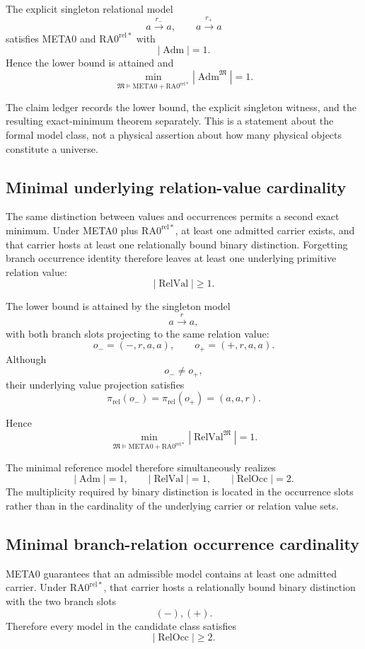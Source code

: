 \documentclass[11pt]{article}
\begin{document}
The explicit singleton relational model
\[
a\xrightarrow{r_-}a,
\qquad
a\xrightarrow{r_+}a
\]
satisfies META0 and \(\mathrm{RA0}^{\mathrm{rel}*}\) with
\[
|\operatorname{Adm}|=1.
\]
Hence the lower bound is attained and
\[
\boxed{
\min_{\mathfrak M\models
\mathrm{META0}+\mathrm{RA0}^{\mathrm{rel}*}}
|\operatorname{Adm}^{\mathfrak M}|
=
1.
}
\]

The claim ledger records the lower bound, the explicit singleton witness, and
the resulting exact-minimum theorem separately. This is a statement about the
formal model class, not a physical assertion about how many physical objects
constitute a universe.

\subsection{Minimal underlying relation-value cardinality}

The same distinction between values and occurrences permits a second exact
minimum. Under META0 plus \(\mathrm{RA0}^{\mathrm{rel}*}\), at least one
admitted carrier exists, and that carrier hosts at least one relationally bound
binary distinction. Forgetting branch occurrence identity therefore leaves at
least one underlying primitive relation value:
\[
\boxed{
|\operatorname{RelVal}|\ge1.
}
\]

The lower bound is attained by the singleton model
\[
a\xrightarrow{r}a,
\]
with both branch slots projecting to the same relation value:
\[
o_-=(-,r,a,a),
\qquad
o_+=(+,r,a,a).
\]
Although
\[
o_-\neq o_+,
\]
their underlying value projection satisfies
\[
\pi_{\mathrm{rel}}(o_-)
=
\pi_{\mathrm{rel}}(o_+)
=
(a,a,r).
\]

Hence
\[
\boxed{
\min_{\mathfrak M\models
\mathrm{META0}+\mathrm{RA0}^{\mathrm{rel}*}}
|\operatorname{RelVal}^{\mathfrak M}|
=
1.
}
\]

The minimal reference model therefore simultaneously realizes
\[
\boxed{
|\operatorname{Adm}|=1,
\qquad
|\operatorname{RelVal}|=1,
\qquad
|\operatorname{RelOcc}|=2.
}
\]
The multiplicity required by binary distinction is located in the occurrence
slots rather than in the cardinality of the underlying carrier or relation
value sets.

\subsection{Minimal branch-relation occurrence cardinality}

META0 guarantees that an admissible model contains at least one admitted
carrier. Under \(\mathrm{RA0}^{\mathrm{rel}*}\), that carrier hosts a
relationally bound binary distinction with the two branch slots
\[
(-),(+).
\]
Therefore every model in the candidate class satisfies
\[
\boxed{
|\operatorname{RelOcc}|\ge2.
}
\]
\end{document}
